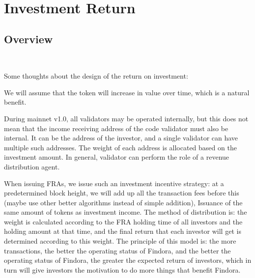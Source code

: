 \section{Investment Return}

\subsection{Overview}

~\par

Some thoughts about the design of the return on investment:

\begin{ITEMIZE}
    \item We will assume that the token will increase in value over time, which is a natural benefit.
    \item During mainnet v1.0, all validators may be operated internally, but this does not mean that the income
        receiving address of the code validator must also be internal. It can be the address of the investor,
        and a single validator can have multiple such addresses. The weight of each address is allocated based
        on the investment amount. In general, validator can perform the role of a revenue distribution agent.
    \item When issuing FRAs, we issue such an investment incentive strategy:
        at a predetermined block height, we will add up all the transaction fees before this
        (maybe use other better algorithms instead of simple addition), Issuance of the same amount
        of tokens as investment income. The method of distribution is: the weight is calculated according
        to the FRA holding time of all investors and the holding amount at that time,
        and the final return that each investor will get is determined according to this weight.
        The principle of this model is: the more transactions, the better the operating status of Findora,
        and the better the operating status of Findora, the greater the expected return of investors,
        which in turn will give investors the motivation to do more things that benefit Findora.
\end{ITEMIZE}